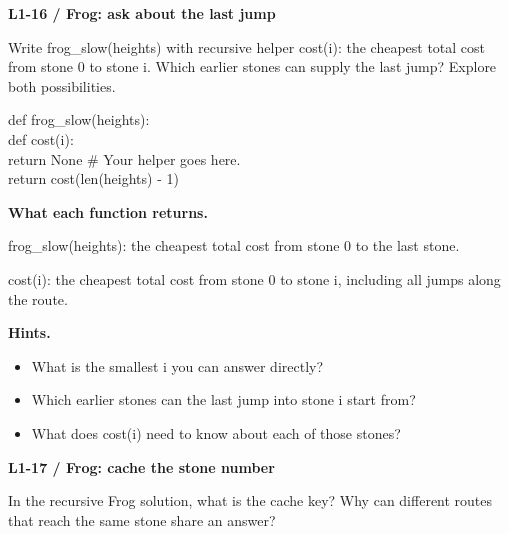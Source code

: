 \documentclass[11pt,a4paper]{article}
\begin{document}
\par\noindent\begin{minipage}{\linewidth}
\textbf{L1-16 / Frog: ask about the last jump}\par\smallskip Write frog\_slow(heights) with recursive helper cost(i): the cheapest total cost from stone 0 to stone i. Which earlier stones can supply the last jump? Explore both possibilities.\par
\par{}\par\smallskip\noindent\colorbox{codepaper}{\parbox{\dimexpr\linewidth-2\fboxsep\relax}{\small\ttfamily\raggedright def frog\_slow(heights):\\\hspace*{2.4em}def cost(i):\\\hspace*{4.8em}return None  \# Your helper goes here.\\\hspace*{2.4em}return cost(len(heights) - 1)}}\par
{\small\textbf{What each function returns.}\par frog\_slow(heights): the cheapest total cost from stone 0 to the last stone.\par cost(i): the cheapest total cost from stone 0 to stone i, including all jumps along the route.\par }
{\small\textbf{Hints.}}\begin{itemize}\item What is the smallest i you can answer directly?\item Which earlier stones can the last jump into stone i start from?\item What does cost(i) need to know about each of those stones?\end{itemize}
\end{minipage}\par\vspace{2mm}
\par\noindent\begin{minipage}{\linewidth}
\textbf{L1-17 / Frog: cache the stone number}\par\smallskip In the recursive Frog solution, what is the cache key? Why can different routes that reach the same stone share an answer?\par
\end{minipage}\par\vspace{2mm}
\end{document}
